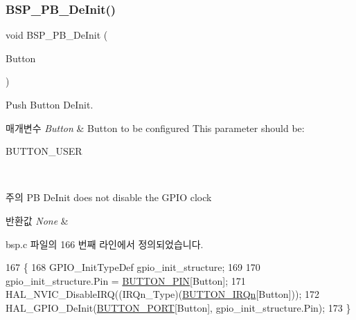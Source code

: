 \subsubsection{\texorpdfstring{B\+S\+P\+\_\+\+P\+B\+\_\+\+De\+Init()}{BSP\_PB\_DeInit()}}
{\footnotesize\ttfamily void B\+S\+P\+\_\+\+P\+B\+\_\+\+De\+Init (\begin{DoxyParamCaption}\item[{\mbox{\hyperlink{_lory_s_d_k__hw__conf_8h_a643816dfbad5c734fc25a29ce8d35bb1}{Button\+\_\+\+Type\+Def}}}]{Button }\end{DoxyParamCaption})}



Push Button De\+Init. 


\begin{DoxyParams}{매개변수}
{\em Button} & Button to be configured This parameter should be\+: \begin{DoxyItemize}
\item B\+U\+T\+T\+O\+N\+\_\+\+U\+S\+ER ~\newline
\end{DoxyItemize}
\\
\hline
\end{DoxyParams}
\begin{DoxyNote}{주의}
PB De\+Init does not disable the G\+P\+IO clock 
\end{DoxyNote}

\begin{DoxyRetVals}{반환값}
{\em None} & \\
\hline
\end{DoxyRetVals}


bsp.\+c 파일의 166 번째 라인에서 정의되었습니다.


\begin{DoxyCode}
167 \{
168   GPIO\_InitTypeDef gpio\_init\_structure;
169 
170   gpio\_init\_structure.Pin = \mbox{\hyperlink{bsp_8c_adf78f2d71408a01f8d30929c2d2da82b}{BUTTON\_PIN}}[Button];
171   HAL\_NVIC\_DisableIRQ((IRQn\_Type)(\mbox{\hyperlink{bsp_8c_a13c3e27c584df9fccc4697dd535ea1cd}{BUTTON\_IRQn}}[Button]));
172   HAL\_GPIO\_DeInit(\mbox{\hyperlink{bsp_8c_ad63ed42b4071e78f80f7462227da4f35}{BUTTON\_PORT}}[Button], gpio\_init\_structure.Pin);
173 \}
\end{DoxyCode}
\mbox{\label{group___b_u_t_t_o_n___functions_ga8f0978b6cffda9c67266ddfdb3a0abf7}} 
